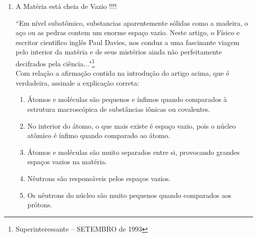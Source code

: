 \documentclass[10pt,a4paper]{article}
\begin{document}
\begin{multicols}{2}
\begin{enumerate}
	
	O texto anterior evidencia a chamada vis\~ao substancialista que ainda se encontra presente no ensino da Qu\'imica.\\
	Abaixo est\~ao relacionadas algumas afirmativas pertinentes ao assunto. 

I. O ouro \'e dourado, pois seus \'atomos s\~ao dourados. Da mesma forma, os \'atomos de prata s\~ao prateados.\\
II. Uma substância ``macia" n\~ao pode ser feita de mol\'eculas ``r\'igidas".\\
III. Uma substância pura possui pontos de ebuli\c{c}\~ao e fus\~ao constantes, em virtude das intera\c{c}ões entre suas mol\'eculas.\\
IV. A expans\~ao dos objetos com a temperatura ocorre porque os \'atomos se expandem.\\

Dessas afirmativas, est\~ao apoiadas na vis\~ao substancialista criticada pelo autor apenas:
	\begin{enumerate}
	\item I e II.
	\item III e IV.
	\item I, II e III.
	\item I, II e IV.
	\item II, III e IV. 
	\end{enumerate}


	\item  \begin{center} A Mat\'eria est\'a cheia de Vazio !!!! \end{center}
		``Em n\'ivel subatômico, substancias aparentemente s\'olidas como a madeira, o a\c{c}o ou as pedras contem um enorme espa\c{c}o vazio. Neste artigo, o F\'isico e escritor cientifico inglês Paul Davies, nos conduz a uma fascinante viagem pelo interior da mat\'eria e de seus mist\'erios ainda n\~ao perfeitamente decifrados pela ciência..."\footnote{Superinteressante – SETEMBRO de 1993}\\
	Com rela\c{c}\~ao a afirma\c{c}\~ao contida na introdu\c{c}\~ao do artigo acima, que \'e verdadeira, assinale a explica\c{c}\~ao correta:
		\begin{enumerate}
		\item \'Atomos e mol\'eculas s\~ao pequenos e \'infimos quando comparados \`a estrutura macrosc\'opica de substâncias iônicas ou covalentes.
		\item No interior do \'atomo, o que mais existe \'e espa\c{c}o vazio, pois o n\'ucleo atômico \'e \'infimo quando comparado ao \'atomo. 
		\item \'Atomos e mol\'eculas s\~ao muito separados entre si, provocando grandes espa\c{c}os vazios na mat\'eria.
		\item Nêutrons s\~ao respons\'aveis pelos espa\c{c}os vazios.
		\item Os nêutrons do n\'ucleo s\~ao muito pequenos quando comparados aos pr\'otons.
		\end{enumerate}




\end{enumerate}
\end{multicols}
\end{document}
